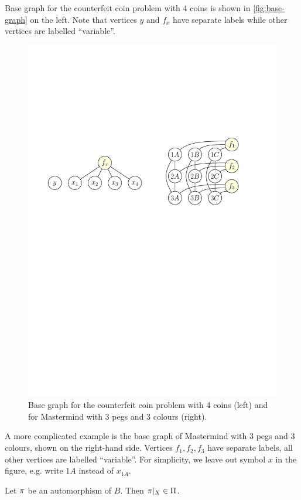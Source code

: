 \begin{example} \label{ex:cc-runbase}
Base graph for the counterfeit coin problem with 4 coins is shown in
\autoref{fig:base-graph} on the left.
Note that vertices $y$ and $f_x$ have separate labels while
  other vertices are labelled ``variable''.

\begin{figure}[ht]
\begin{center}
\includegraphics[width=.6\textwidth]{pictures/base-graph.pdf}
\caption{Base graph for the counterfeit coin problem with 4 coins (left) and\\
  for Mastermind with 3 pegs and 3 colours (right).}
\label{fig:base-graph}
\end{center}
\end{figure}
\end{example}

A more complicated example is the base graph of Mastermind with 3 pegs and 3 colours,
  shown on the right-hand side.
Vertices $f_1, f_2, f_3$ have separate labels, all other vertices are labelled ``variable''.
For simplicity, we leave out symbol $x$ in the figure, e.g.
  write $1A$ instead of $x_{1A}$.\eqed

\begin{lemma}\label{lma:autobase}
Let  $\pi$ be an automorphism of $B$. Then $\pi|_X \in\Pi$.
\end{lemma}

